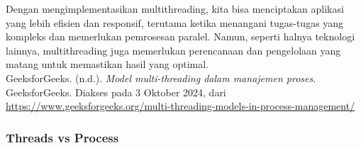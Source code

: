 \documentclass[12pt]{article}
\begin{document}
Dengan mengimplementasikan multithreading, kita bisa menciptakan aplikasi yang lebih efisien dan responsif, terutama ketika menangani tugas-tugas yang kompleks dan memerlukan pemrosesan paralel. Namun, seperti halnya teknologi lainnya, multithreading juga memerlukan perencanaan dan pengelolaan yang matang untuk memastikan hasil yang optimal.\\

\noindent GeeksforGeeks. (n.d.). \textit{Model multi-threading dalam manajemen proses}. GeeksforGeeks. Diakses pada 3 Oktober 2024, dari \url{https://www.geeksforgeeks.org/multi-threading-models-in-process-management/}

\subsubsection{Threads vs Process}
\end{document}
